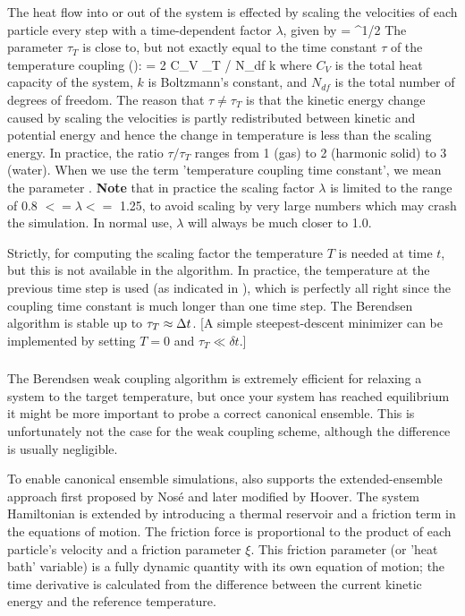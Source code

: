 The heat flow into or out of the system is effected by scaling the
velocities of each particle every step with a time-dependent factor
$\lambda$, given by
\beq 
\lambda = ^{1/2}
\label{eqn:lambda}
\eeq
The parameter $\tau_T$ is close to, but not exactly equal to the time constant
$\tau$ of the temperature coupling ():
\beq
\tau = 2 C_V \tau_T / N_{df} k
\eeq
where $C_V$ is the total heat capacity of the system, $k$ is Boltzmann's
constant, and $N_{df}$ is the total number of degrees of freedom. The
reason that $\tau \neq \tau_T$ is that the kinetic energy change
caused by scaling the velocities is partly redistributed between
kinetic and potential energy and hence the change in temperature is
less than the scaling energy.  In practice, the ratio $\tau / \tau_T$
ranges from 1 (gas) to 2 (harmonic solid) to 3 (water). When we use
the term 'temperature coupling time constant', we mean the parameter
.  
{\bf Note} that in practice the scaling factor $\lambda$ is limited to 
the range of 0.8 $<= \lambda <=$ 1.25, to avoid scaling by very large
numbers which may crash the simulation. In normal use, 
$\lambda$ will always be much closer to 1.0.
  
Strictly, for computing the scaling factor the temperature $T$ is
needed at time $t$, but this is not available in the algorithm. In
practice, the temperature at the previous time step is used (as
indicated in ), which is perfectly all right since the
coupling time constant is much longer than one time step. The
Berendsen algorithm is stable up to $\tau_T \approx {\Delta t}$.  [A simple
steepest-descent minimizer can be implemented by setting $T=0$ and
$\tau_T \ll \delta t$.]

\subsubsection{}
The Berendsen weak coupling algorithm is extremely efficient for relaxing
a system to the target temperature, but once your system
has reached equilibrium it might be more important to probe a
correct canonical ensemble. This is unfortunately not the case for
the weak coupling scheme, although the difference is usually negligible.

To enable canonical ensemble simulations, {\gromacs} also supports the 
extended-ensemble approach first proposed by Nos\'e\cite{Nose84} and later 
modified by Hoover\cite{Hoover85}. The system Hamiltonian 
is extended by introducing a 
thermal reservoir and a friction term in the equations of motion.
The friction force is proportional to the product of each particle's
velocity and a friction parameter $\xi$. This friction
parameter (or 'heat bath' variable) is a fully dynamic quantity with
its own equation of motion; the time 
derivative is calculated from the difference between the current
kinetic energy and the reference temperature. 

